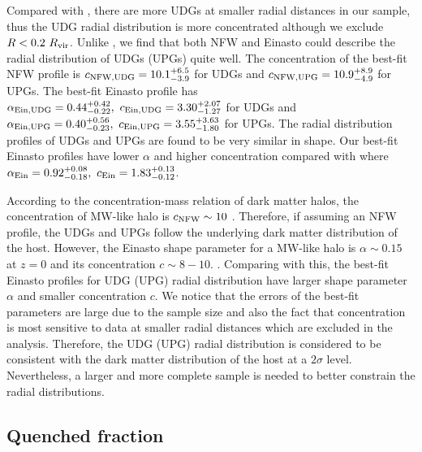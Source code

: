 \documentclass[twocolumn,astrosymb,twocolappendix]{aastex631}
\begin{document}
\begin{CJK*}{UTF8}{gbsn}
Compared with \citet{vdBurg2016}, there are more UDGs at smaller radial distances in our sample, thus the UDG radial distribution is more concentrated although we exclude $R < 0.2\ R_{\rm vir}$. Unlike \citet{vdBurg2016}, we find that both NFW and Einasto could describe the radial distribution of UDGs (UPGs) quite well. The concentration of the best-fit NFW profile is $c_{\rm NFW, UDG} = 10.1^{+6.5}_{-3.9}$ for UDGs and $c_{\rm NFW, UPG} = 10.9^{+8.9}_{-4.9}$ for UPGs. The best-fit Einasto profile has $\alpha_{\rm Ein, UDG} = 0.44^{+0.42}_{-0.22},\ c_{\rm Ein, UDG} = 3.30^{+2.07}_{-1.27}$ for UDGs and $\alpha_{\rm Ein, UPG} = 0.40^{+0.56}_{-0.23},\ c_{\rm Ein, UPG} = 3.55^{+3.63}_{-1.80}$ for UPGs. The radial distribution profiles of UDGs and UPGs are found to be very similar in shape. Our best-fit Einasto profiles have lower $\alpha$ and higher concentration compared with \citet{vdBurg2016} where $\alpha_{\rm Ein} = 0.92^{+0.08}_{-0.18},\ c_{\rm Ein} = 1.83^{+0.13}_{-0.12}$.

According to the concentration-mass relation of dark matter halos, the concentration of MW-like halo is $c_{\rm NFW} \sim 10$ \citep{Bullock2001,Duffy2008,Dutton2014}. Therefore, if assuming an NFW profile, the UDGs and UPGs follow the underlying dark matter distribution of the host. However, the Einasto shape parameter for a MW-like halo is $\alpha\sim 0.15$ at $z=0$ and its concentration $c\sim 8-10$. \citep{Gao2008,Dutton2014}. Comparing with this, the best-fit Einasto profiles for UDG (UPG) radial distribution have larger shape parameter $\alpha$ and smaller concentration $c$. We notice that the errors of the best-fit parameters are large due to the sample size and also the fact that concentration is most sensitive to data at smaller radial distances which are excluded in the analysis. Therefore, the UDG (UPG) radial distribution is considered to be consistent with the dark matter distribution of the host at a $2\sigma$ level. Nevertheless, a larger and more complete sample is needed to better constrain the radial distributions. 


\subsection{Quenched fraction}\label{sec:quench}


\end{CJK*}
\end{document}
